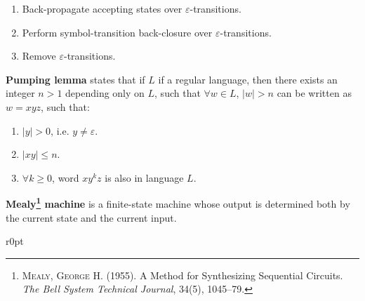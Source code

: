 \documentclass[a4paper,10pt]{article}
\begin{document}
\begin{terms}
\begin{enumerate}
        \item Back-propagate accepting states over $\varepsilon$-transitions.

        \item Perform symbol-transition back-closure over $\varepsilon$-transitions.

        \item Remove $\varepsilon$-transitions.
    \end{enumerate}

    \item \textbf{Pumping lemma} states that if $L$ if a regular language, then there exists an integer $n > 1$ depending only on $L$, such that $\forall w \in L$, $|w| > n$ can be written as $w = xyz$, such that:

    \begin{enumerate}
        \item $|y| > 0$, i.e. $y \neq \varepsilon$.

        \item $|xy| \leq n$.

        \item $\forall k \geq 0$, word $x y^{k} z$ is also in language $L$.
    \end{enumerate}


    \item \textbf{Mealy\footnote{\textsc{Mealy, George H.} (1955). A Method for Synthesizing Sequential Circuits.
    \textit{The Bell System Technical Journal}, 34(5), 1045--79.} machine} is a finite-state machine whose output is determined both by the current state and the current input.

    \begin{minipage}{\linewidth}
    \begin{wrapfigure}{r}{0pt}
        \vspace{-\intextsep}
    \end{wrapfigure}


\end{minipage}
\end{terms}
\end{document}
